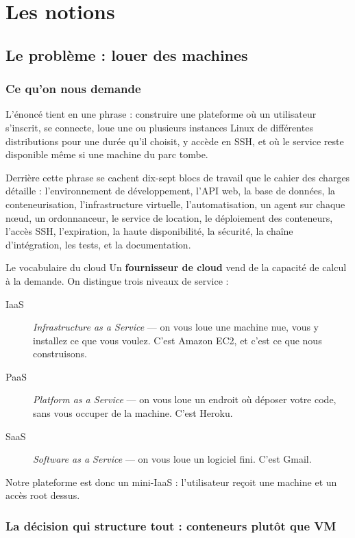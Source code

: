 \part{Les notions}
\label{part:theorie}

\chapter{Le problème : louer des machines}

\section{Ce qu'on nous demande}

L'énoncé tient en une phrase : construire une plateforme où un utilisateur
s'inscrit, se connecte, loue une ou plusieurs instances Linux de différentes
distributions pour une durée qu'il choisit, y accède en SSH, et où le service
reste disponible même si une machine du parc tombe.

Derrière cette phrase se cachent dix-sept blocs de travail que le cahier des
charges détaille : l'environnement de développement, l'API web, la base de
données, la conteneurisation, l'infrastructure virtuelle, l'automatisation, un
agent sur chaque nœud, un ordonnanceur, le service de location, le déploiement
des conteneurs, l'accès SSH, l'expiration, la haute disponibilité, la sécurité,
la chaîne d'intégration, les tests, et la documentation.

\begin{notion}{Le vocabulaire du cloud}
Un \textbf{fournisseur de cloud} vend de la capacité de calcul à la demande. On
distingue trois niveaux de service :
\begin{description}
\item[IaaS] \emph{Infrastructure as a Service} --- on vous loue une machine
  nue, vous y installez ce que vous voulez. C'est Amazon EC2, et c'est ce que
  nous construisons.
\item[PaaS] \emph{Platform as a Service} --- on vous loue un endroit où
  déposer votre code, sans vous occuper de la machine. C'est Heroku.
\item[SaaS] \emph{Software as a Service} --- on vous loue un logiciel fini.
  C'est Gmail.
\end{description}
Notre plateforme est donc un mini-IaaS : l'utilisateur reçoit une machine et un
accès root dessus.
\end{notion}

\section{La décision qui structure tout : conteneurs plutôt que VM}

